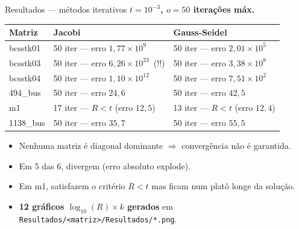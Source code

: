 \documentclass[10pt,aspectratio=169]{beamer}
\begin{document}
\begin{frame}{Resultados --- métodos iterativos}
  \textbf{$t = 10^{-3}$, $o = 50$ iterações máx.}

  \vspace{0.4em}
  \begin{table}
  \centering
  \scriptsize
  \begin{tabular}{lll}
    \toprule
    \textbf{Matriz} & \textbf{Jacobi} & \textbf{Gauss-Seidel} \\
    \midrule
    bcsstk01  & 50 iter --- erro $1{,}77\times 10^{9}$  & 50 iter --- erro $2{,}01\times 10^{5}$ \\
    \alert{bcsstk03}  & \alert{50 iter --- erro $6{,}26\times 10^{23}$~(!!)} & 50 iter --- erro $3{,}38\times 10^{8}$ \\
    bcsstk04  & 50 iter --- erro $1{,}10\times 10^{12}$ & 50 iter --- erro $7{,}51\times 10^{2}$ \\
    494\_bus  & 50 iter --- erro $24{,}6$               & 50 iter --- erro $42{,}5$ \\
    \alert{m1}        & \alert{17 iter --- $R<t$} (erro $12{,}5$) & \alert{13 iter --- $R<t$} (erro $12{,}4$) \\
    1138\_bus & 50 iter --- erro $35{,}7$               & 50 iter --- erro $55{,}5$ \\
    \bottomrule
  \end{tabular}
  \end{table}

  \vspace{0.6em}
  \begin{itemize}
    \item Nenhuma matriz é diagonal dominante $\Rightarrow$ convergência \alert{não é garantida}.
    \item Em 5 das 6, \alert{divergem} (erro absoluto explode).
    \item Em m1, satisfazem o critério $R<t$ mas \alert{ficam num platô longe da solução}.
    \item \textbf{12 gráficos $\log_{10}(R) \times k$ gerados} em \texttt{Resultados/<matriz>/Resultados/*.png}.
  \end{itemize}
\end{frame}
\end{document}
